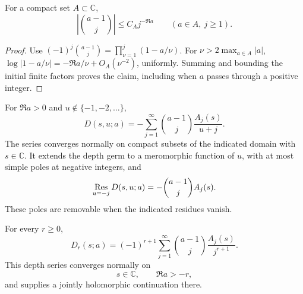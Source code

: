 \begin{lemma}\label{hn:lem:binomial}
For a compact set $A\subset\mathbb C$,
\[
 \left|\binom{a-1}{j}\right|\le C_A j^{-\Re a}
 \qquad(a\in A,\ j\ge1).
\]
\end{lemma}
\begin{proof}
Use $(-1)^j\binom{a-1}{j}=\prod_{\nu=1}^j(1-a/\nu)$.
For $\nu>2\max_{a\in A}|a|$,
$\log|1-a/\nu|=-\Re a/\nu+O_A(\nu^{-2})$, uniformly.
Summing and bounding the initial finite factors proves the claim,
including when $a$ passes through a positive integer.
\end{proof}

\begin{theorem}\label{hn:thm:newton}
For $\Re a>0$ and $u\notin\{-1,-2,\ldots\}$,
\begin{equation}\label{hn:eq:newton}
 \boxed{\displaystyle
 D(s,u;a)=-\sum_{j=1}^\infty
                \binom{a-1}{j}\frac{A_j(s)}{u+j}.}
\end{equation}
The series converges normally on compact subsets of the indicated
domain with $s\in\mathbb C$. It extends the depth germ to a
meromorphic function of $u$, with at most simple poles at negative
integers, and
\begin{equation}\label{hn:eq:uresidue}
 \mathop{\rm Res}_{u=-j}D(s,u;a)=-\binom{a-1}{j}A_j(s).
\end{equation}
These poles are removable when the indicated residues vanish.

For every $r\ge0$,
\begin{equation}\label{hn:eq:depthnewton}
 \boxed{\displaystyle
 D_r(s;a)=(-1)^{r+1}\sum_{j=1}^\infty
          \binom{a-1}{j}\frac{A_j(s)}{j^{r+1}}.}
\end{equation}
This depth series converges normally on
\begin{equation}\label{hn:eq:shift-domain}
                  s\in\mathbb C,\qquad \Re a>-r,
\end{equation}
and supplies a jointly holomorphic continuation there.
\end{theorem}


